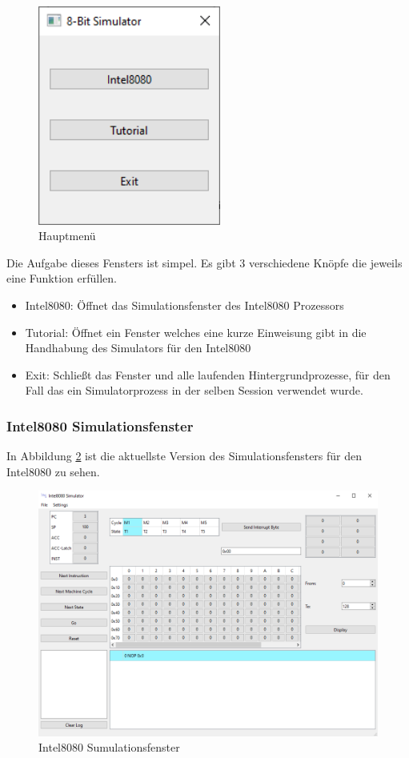 \documentclass[12pt]{article}
\newcommand{\imgSpaceBefore}{\vspace{10pt}}
\begin{document}
\begin{figure}[H]
\centering
\includegraphics[width=6cm]{bilder/Hauptmenue}
\caption{Hauptmenü}
\label{fig:Hauptmenue}
\end{figure}

\noindent
Die Aufgabe dieses Fensters ist simpel. Es gibt 3 verschiedene Knöpfe die jeweils eine Funktion erfüllen.
\begin{itemize}
	\item Intel8080: Öffnet das Simulationsfenster des Intel8080 Prozessors
	\item Tutorial: Öffnet ein Fenster welches eine kurze Einweisung gibt in die Handhabung des Simulators für den Intel8080
	\item Exit: Schließt das Fenster und alle laufenden Hintergrundprozesse, für den Fall das ein Simulatorprozess in der selben Session verwendet wurde.
\end{itemize}

\subsubsection{Intel8080 Simulationsfenster}
In Abbildung \ref{fig:I8080MW} ist die aktuellste Version des Simulationsfensters für den Intel8080 zu sehen.\imgSpaceBefore

\begin{figure}[H]
\centering
\includegraphics[width=15cm]{bilder/Intel8080_MainWindow}
\caption{Intel8080 Sumulationsfenster}
\label{fig:I8080MW}
\end{figure}
\end{document}
